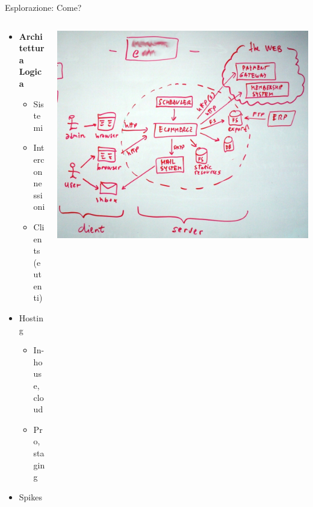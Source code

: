 \documentclass[compress, red, 14pt, pdf]{beamer}
\begin{document}
	\begin{frame}{Esplorazione: Come?}
		
		\begin{columns}[T]
		    \begin{column}{.5\textwidth}

		\begin{itemize}
			\item \textbf{Architettura Logica}
			\begin{itemize}
				\item Sistemi
				\item Interconnessioni
				\item Clients (e utenti)
			\end{itemize}
		\end{itemize}		
		
		\begin{itemize}
			\item Hosting
			\begin{itemize}
				\item In-house, cloud
				\item Pro, staging
			\end{itemize}
			\item Spikes
		\end{itemize}
		
	    \end{column}
	    \begin{column}{.5\textwidth}
			\hspace*{-0.6cm} \includegraphics[scale=0.15]{images/architecture-1}
	    \end{column}
	 \end{columns}

	\end{frame}
	
\end{document}
